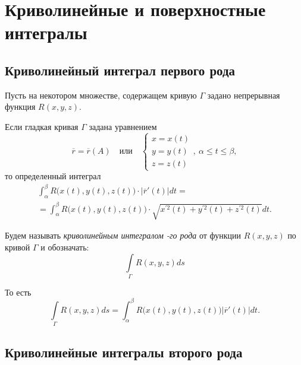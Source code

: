 \section{Криволинейные и поверхностные интегралы}

\setcounter{subsection}{99}

\subsection{Криволинейный интеграл первого рода}

\begin{note}
    Пусть на некотором множестве, содержащем кривую $ \Gamma $ задано непрерывная функция $ R(x,y,z) $.

    Если гладкая кривая $ \Gamma $ задана уравнением
    \[
        \overline{r} = \overline{r}(A) \quad \text{или} \quad \left\{\begin{array}{l}
            x = x(t) \\
            y = y(t) \\
            z = z(t)
        \end{array}\right., \ \alpha \leqslant t \leqslant\beta,
    \]
    то определенный интеграл
    \begin{multline*}
        \int_{\alpha}^{\beta}R\big(x(t),y(t),z(t)\big)\cdot \big|\overline{r}'(t)\big|dt = \\
        = \int_{\alpha}^{\beta}R\bigl(x(t),y(t),z(t)\bigr)\cdot\sqrt{x^{'2}(t) + y^{'2}(t) + z^{'2}(t)}dt.
    \end{multline*}

    Будем называть \emph{криволинейным интегралом -го рода} от функции $ R(x,y,z) $ по кривой $ \Gamma $ и обозначать:
    \[
        \boxed{\int\limits_\Gamma R(x,y,z)ds}
    \]

    То есть
    \[
        \int\limits_\Gamma R(x,y,z)ds = \int_{\alpha}^{\beta}R\big(x(t),y(t),z(t)\big)\big|\overline{r}'(t)\big|dt.
    \]
\end{note}

\subsection{Криволинейные интегралы второго рода}

